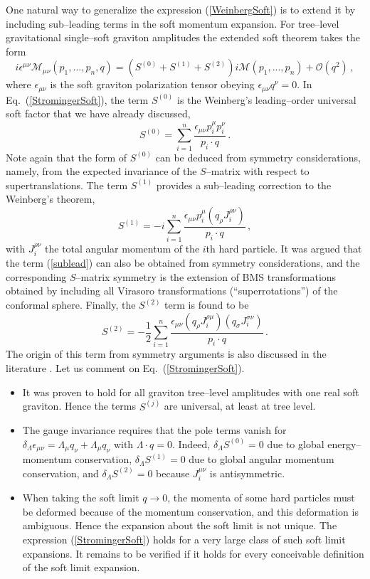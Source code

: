 \documentclass[11pt,a4paper]{article}
\newcommand{\be}{\begin{equation}}
\newcommand{\ee}{\end{equation}}
\newcommand{\M}{\mathcal{M}}
\begin{document}
One natural way to generalize the expression (\ref{WeinbergSoft}) is to extend it by including sub--leading terms in the soft momentum expansion. For tree--level gravitational single--soft graviton amplitudes the extended soft theorem takes the form \cite{Cachazo:2014fwa}
\be\label{StromingerSoft}
i\epsilon^{\mu\nu}\M_{\mu\nu}(p_1,...,p_n,q)=(S^{(0)}+S^{(1)}+S^{(2)})i\M(p_1,...,p_n)+\mathcal{O}(q^2)\,,
\ee
where $\epsilon_{\mu\nu}$ is the soft graviton polarization tensor obeying $\epsilon_{\mu\nu}q^\nu=0$. In Eq.~(\ref{StromingerSoft}), the term $S^{(0)}$ is the Weinberg's leading--order universal soft factor that we have already discussed,
\be\label{lead}
S^{(0)}=\sum_{i=1}^n\dfrac{\epsilon_{\mu\nu}p^\mu_ip^\nu_i}{p_i\cdot q}\,.
\ee
Note again that the form of $S^{(0)}$ can be deduced from symmetry considerations, namely, from the expected invariance of the $S$--matrix with respect to supertranslations. The term $S^{(1)}$ provides a sub--leading correction to the Weinberg's theorem,
\be\label{sublead}
S^{(1)}=-i\sum_{i=1}^n\dfrac{\epsilon_{\mu\nu}p_i^\mu(q_\rho J^{\rho\nu}_i)}{p_i\cdot q}\,,
\ee
with $J^{\rho\nu}_i$ the total angular momentum of the $i$th hard particle. It was argued that the term (\ref{sublead}) can also be obtained from symmetry considerations, and the corresponding $S$--matrix symmetry is the extension of BMS transformations obtained by including all Virasoro transformations (``superrotations'') of the conformal sphere. Finally, the $S^{(2)}$ term is found to be
\be
S^{(2)}=-\dfrac{1}{2}\sum_{i=1}^n\dfrac{\epsilon_{\mu\nu}(q_\rho J^{\rho\mu}_i)(q_\sigma J^{\sigma\nu}_i)}{p_i\cdot q}\,.
\ee
The origin of this term from symmetry arguments is also discussed in the literature \cite{Campiglia:2016efb}. Let us comment on Eq.~(\ref{StromingerSoft}).
\begin{itemize}
\item It was proven to hold for all graviton tree--level amplitudes with one real soft graviton. Hence the terms $S^{(j)}$ are universal, at least at tree level.
\item The gauge invariance requires that the pole terms vanish for $\delta_\Lambda \epsilon_{\mu\nu}=\Lambda_\mu q_\nu+\Lambda_\mu q_\nu$ with $\Lambda\cdot q=0$. Indeed, $\delta_\Lambda S^{(0)}=0$ due to global energy--momentum conservation, $\delta_\Lambda S^{(1)}=0$ due to global angular momentum conservation, and $\delta_\Lambda S^{(2)}=0$ because $J^{\mu\nu}_i$ is antisymmetric.
\item When taking the soft limit $q\rightarrow 0$, the momenta of some hard particles must be deformed because of the momentum conservation, and this deformation is ambiguous. Hence the expansion about the soft limit is not unique. The expression (\ref{StromingerSoft}) holds for a very large class of such soft limit expansions. It remains to be verified if it holds for every conceivable definition of the soft limit expansion.
\end{itemize}
\end{document}
